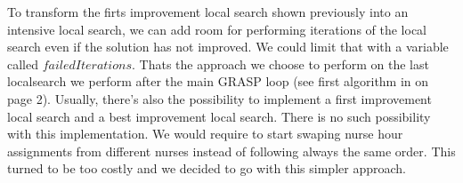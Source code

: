 To transform the firts improvement local search shown previously into an intensive local search,  we can add room for performing iterations of the local search even if the solution has not improved. We could limit that with a variable called $failedIterations$. Thats the approach we choose to perform on the last localsearch we perform after the main GRASP loop (see first algorithm in \cite{grasp} on page 2).
Usually, there's also the possibility to implement a first improvement local search and a best improvement local search. There is no such possibility with this implementation. We would require to start swaping nurse hour assignments from different nurses instead of following always the same order. This turned to be too costly and we decided to go with this simpler approach.




